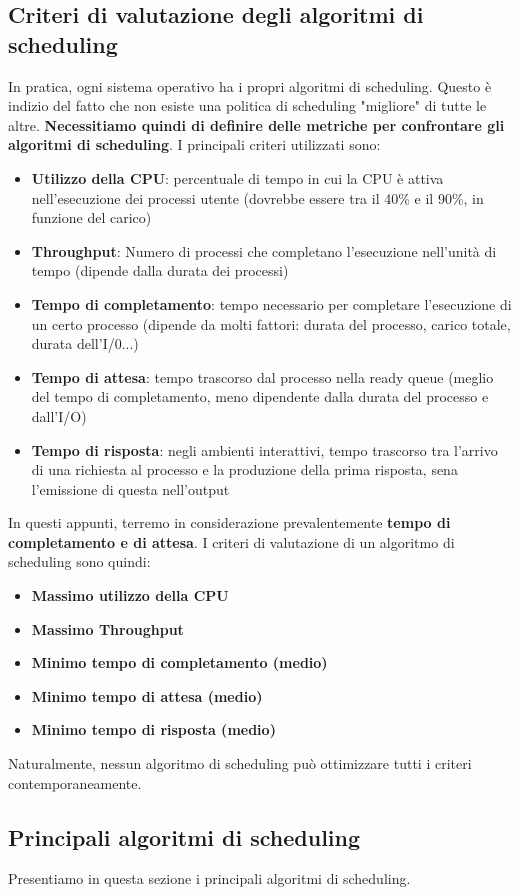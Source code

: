 \documentclass[12pt]{article}
\begin{document}
\subsection{Criteri di valutazione degli algoritmi di scheduling}
In pratica, ogni sistema operativo ha i propri algoritmi di scheduling.
Questo è indizio del fatto che non esiste una politica di scheduling "migliore" di tutte le altre.
\textbf{Necessitiamo quindi di definire delle metriche per confrontare gli algoritmi di scheduling}.
I principali criteri utilizzati sono:
\begin{itemize}
    \item \textbf{Utilizzo della CPU}: percentuale di tempo in cui la CPU è attiva nell'esecuzione dei processi utente (dovrebbe essere tra il 40\% e il 90\%, in funzione del carico)
    \item \textbf{Throughput}: Numero di processi che completano l'esecuzione nell'unità di tempo (dipende dalla durata dei processi)
    \item \textbf{Tempo di completamento}: tempo necessario per completare l'esecuzione di un certo processo (dipende da molti fattori: durata del processo, carico totale, durata dell'I/0...)
    \item \textbf{Tempo di attesa}: tempo trascorso dal processo nella ready queue (meglio del tempo di completamento, meno dipendente dalla durata del processo e dall'I/O)
    \item \textbf{Tempo di risposta}: negli ambienti interattivi, tempo trascorso tra l'arrivo di una richiesta al processo e la produzione della prima risposta, sena l'emissione di questa nell'output
\end{itemize}
In questi appunti, terremo in considerazione prevalentemente \textbf{tempo di completamento e di attesa}.
I criteri di valutazione di un algoritmo di scheduling sono quindi:
\begin{itemize}
    \item \textbf{Massimo utilizzo della CPU}
    \item \textbf{Massimo Throughput}
    \item \textbf{Minimo tempo di completamento (medio)}
    \item \textbf{Minimo tempo di attesa (medio)}
    \item \textbf{Minimo tempo di risposta (medio)}
\end{itemize}
Naturalmente, nessun algoritmo di scheduling può ottimizzare tutti i criteri contemporaneamente.
\subsection{Principali algoritmi di scheduling}
Presentiamo in questa sezione i principali algoritmi di scheduling.
\end{document}
